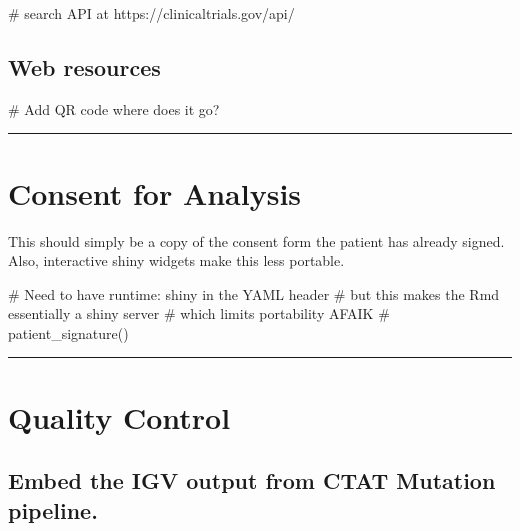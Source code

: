 \documentclass[
]{article}
\newenvironment{Shaded}{\begin{snugshade}}{\end{snugshade}}
\newcommand{\CommentTok}[1]{\textcolor[rgb]{0.48,0.49,0.49}{#1}}
\begin{document}
\begin{Shaded}
\begin{Highlighting}[]
\CommentTok{\# search API at https://clinicaltrials.gov/api/}
\end{Highlighting}
\end{Shaded}

\hypertarget{web-resources}{%
\subsection{Web resources}\label{web-resources}}

\begin{Shaded}
\begin{Highlighting}[]
\CommentTok{\# Add QR code where does it go?}
\end{Highlighting}
\end{Shaded}

\begin{center}\rule{0.5\linewidth}{0.5pt}\end{center}

\hypertarget{consent-for-analysis}{%
\section{Consent for Analysis}\label{consent-for-analysis}}

This should simply be a copy of the consent form the patient has already
signed. Also, interactive shiny widgets make this less portable.

\begin{Shaded}
\begin{Highlighting}[]
\CommentTok{\# Need to have runtime: shiny in the YAML header}
\CommentTok{\# but this makes the Rmd essentially a shiny server}
\CommentTok{\# which limits portability AFAIK}
\CommentTok{\# patient\_signature()}
\end{Highlighting}
\end{Shaded}

\begin{center}\rule{0.5\linewidth}{0.5pt}\end{center}

\hypertarget{quality-control}{%
\section{Quality Control}\label{quality-control}}

\hypertarget{embed-the-igv-output-from-ctat-mutation-pipeline.}{%
\subsection{Embed the IGV output from CTAT Mutation
pipeline.}\label{embed-the-igv-output-from-ctat-mutation-pipeline.}}
\end{document}
